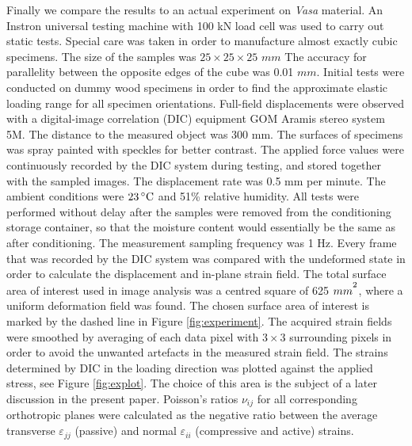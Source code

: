 \documentclass[review]{elsarticle}
\begin{document}
Finally we compare the results to an actual experiment on \textit{Vasa}
material.
An Instron universal testing machine with 100 kN load cell was used to carry out static tests. 
Special care was taken in order to manufacture almost exactly cubic specimens. 
The size of the samples was  $25\times25\times25$ $mm$  The accuracy for
parallelity between the opposite edges of the cube was 0.01 $mm$. 
Initial tests were conducted on dummy wood specimens in order to find the approximate elastic loading range for all specimen orientations.
Full-field displacements were observed with a digital-image correlation (DIC) equipment GOM Aramis stereo system 5M.
The distance to the measured object was 300 mm. The surfaces of specimens was spray
painted with speckles for better contrast. The applied force values were continuously recorded by the DIC system during testing, and stored together with the sampled images. The displacement rate was 0.5 mm per minute. 
The ambient conditions were $23\,^{\circ}{\rm C}$ and 51\% relative humidity.
All tests were performed without delay after the samples were removed from the conditioning storage container, so that the moisture content would essentially be the same as after conditioning. The measurement sampling frequency was 1 Hz. 
Every frame that was recorded by the DIC system was compared with the undeformed state in order to calculate the displacement and in-plane strain field. 
The total surface area of interest used in image analysis was a centred square
of 625 $mm^\textsuperscript{2}$, where a uniform deformation field was found.
The chosen surface area of interest is marked by the dashed line in Figure
\ref{fig:experiment}. The acquired strain fields were smoothed by averaging of
each data pixel with $3\times3$ surrounding pixels in order to avoid the
unwanted artefacts in the measured strain field.
The strains determined by DIC in the loading direction was plotted against the applied stress, see Figure
\ref{fig:explot}. The choice of this area is the subject of a later
discussion in the present paper.
Poisson's ratios $\nu_{ij}$ for all corresponding orthotropic planes were
calculated as the negative ratio between the average transverse
$\varepsilon_{jj}$ (passive) and normal $\varepsilon_{ii}$ (compressive and active) strains.
\end{document}
